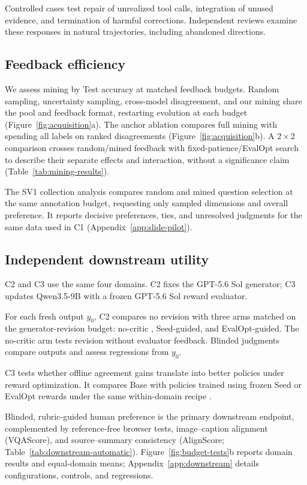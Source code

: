 Controlled cases test repair of unrealized tool calls, integration of unused evidence, and termination of harmful corrections.
Independent reviews examine these responses in natural trajectories, including abandoned directions.

\subsection{Feedback efficiency}
\label{sec:feedback-efficiency}

We assess mining by Test accuracy at matched feedback budgets.
Random sampling, uncertainty sampling, cross-model disagreement, and our mining share the pool and feedback format, restarting evolution at each budget (Figure~\ref{fig:acquisition}a).
The anchor ablation compares full mining with spending all labels on ranked disagreements (Figure~\ref{fig:acquisition}b).
A $2\times2$ comparison crosses random/mined feedback with fixed-patience/EvalOpt search to describe their separate effects and interaction, without a significance claim (Table~\ref{tab:mining-results}).

The SV1 collection analysis compares random and mined question selection at the same annotation budget, requesting only sampled dimensions and overall preference.
It reports decisive preferences, ties, and unresolved judgments for the same data used in C1 (Appendix~\ref{app:slide-pilot}).

\subsection{Independent downstream utility}
\label{sec:downstream-utility}

C2 and C3 use the same four domains.
C2 fixes the GPT-5.6 Sol generator; C3 updates Qwen3.5-9B with a frozen GPT-5.6 Sol reward evaluator.

For each fresh output $y_0$, C2 compares no revision with three arms matched on the generator-revision budget: no-critic \citep{madaan2023selfrefine}, Seed-guided, and EvalOpt-guided.
The no-critic arm tests revision without evaluator feedback.
Blinded judgments compare outputs and assess regressions from $y_0$.

C3 tests whether offline agreement gains translate into better policies under reward optimization.
It compares Base with policies trained using frozen Seed or EvalOpt rewards under the same within-domain recipe \citep{hu2022lora,shao2024deepseekmath}.

Blinded, rubric-guided human preference is the primary downstream endpoint, complemented by reference-free browser tests, image--caption alignment (VQAScore), and source--summary consistency (AlignScore; Table~\ref{tab:downstream-automatic}).
Figure~\ref{fig:budget-tests}b reports domain results and equal-domain means; Appendix~\ref{app:downstream} details configurations, controls, and regressions.
